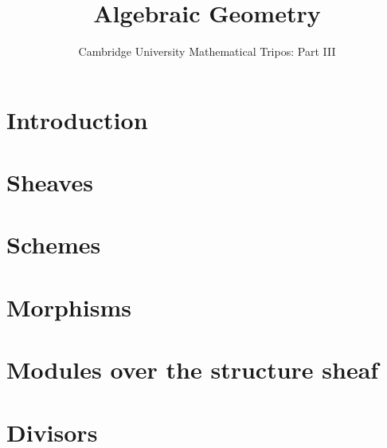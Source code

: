 \documentclass{article}
\title{Algebraic Geometry}
\author{Cambridge University Mathematical Tripos: Part III}
\begin{document}
\maketitle

\tableofcontentsnewpage{}


\section{Introduction}

\section{Sheaves}

\section{Schemes}

\section{Morphisms}

\section{Modules over the structure sheaf}

\section{Divisors}

\end{document}
